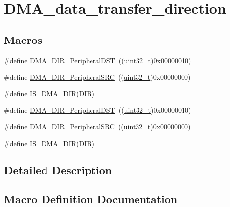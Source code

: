 \hypertarget{group___d_m_a__data__transfer__direction}{}\section{D\+M\+A\+\_\+data\+\_\+transfer\+\_\+direction}
\label{group___d_m_a__data__transfer__direction}
\subsection*{Macros}
\begin{DoxyCompactItemize}
\item 
\#define \hyperlink{group___d_m_a__data__transfer__direction_ga51567b748ddac277743c65c20275971a}{D\+M\+A\+\_\+\+D\+I\+R\+\_\+\+Peripheral\+D\+ST}~((\hyperlink{_p_e___types_8h_a33594304e786b158f3fb30289278f5af}{uint32\+\_\+t})0x00000010)
\item 
\#define \hyperlink{group___d_m_a__data__transfer__direction_ga5ce120a044359410136695a2c05df68e}{D\+M\+A\+\_\+\+D\+I\+R\+\_\+\+Peripheral\+S\+RC}~((\hyperlink{_p_e___types_8h_a33594304e786b158f3fb30289278f5af}{uint32\+\_\+t})0x00000000)
\item 
\#define \hyperlink{group___d_m_a__data__transfer__direction_gaaad13d2b5808e32a35a2d21bcdbb2296}{I\+S\+\_\+\+D\+M\+A\+\_\+\+D\+IR}(D\+IR)
\item 
\#define \hyperlink{group___d_m_a__data__transfer__direction_ga51567b748ddac277743c65c20275971a}{D\+M\+A\+\_\+\+D\+I\+R\+\_\+\+Peripheral\+D\+ST}~((\hyperlink{_p_e___types_8h_a33594304e786b158f3fb30289278f5af}{uint32\+\_\+t})0x00000010)
\item 
\#define \hyperlink{group___d_m_a__data__transfer__direction_ga5ce120a044359410136695a2c05df68e}{D\+M\+A\+\_\+\+D\+I\+R\+\_\+\+Peripheral\+S\+RC}~((\hyperlink{_p_e___types_8h_a33594304e786b158f3fb30289278f5af}{uint32\+\_\+t})0x00000000)
\item 
\#define \hyperlink{group___d_m_a__data__transfer__direction_gaaad13d2b5808e32a35a2d21bcdbb2296}{I\+S\+\_\+\+D\+M\+A\+\_\+\+D\+IR}(D\+IR)
\end{DoxyCompactItemize}


\subsection{Detailed Description}


\subsection{Macro Definition Documentation}
